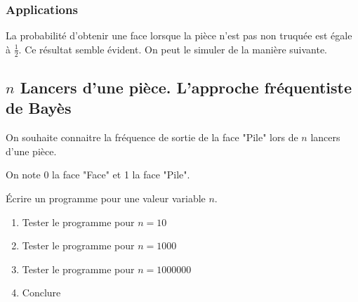 \subsubsection*{Applications}

La probabilité d'obtenir une face lorsque la pièce n'est pas non truquée est égale à $\frac{1}{2}$. Ce résultat semble évident. On peut le simuler de la manière suivante.


\subsection*{$n$ Lancers d'une pièce. L'approche fréquentiste de Bayès}

On souhaite connaitre la fréquence de sortie de la face "Pile" lors de $n$ lancers d'une pièce. 

On note 0 la face "Face" et 1 la face "Pile".

Écrire un programme pour une valeur variable $n$.

\begin{enumerate}
\item Tester le programme pour $n=10$
\item Tester le programme pour $n=1000$
\item Tester le programme pour $n=1000000$
\item Conclure
\end{enumerate}

%
%
%
%
%
%
%
%
%
%
%
%


